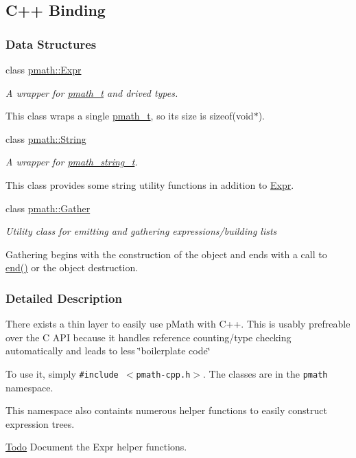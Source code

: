 \hypertarget{group__cpp__binding}{
\subsection{C++ Binding}
\label{group__cpp__binding}
}
\subsubsection*{Data Structures}
\begin{CompactItemize}
\item 
class \hyperlink{classpmath_1_1_expr}{pmath::Expr}
\begin{CompactList}\small\item\em A wrapper for \hyperlink{classpmath__t}{pmath\_\-t} and drived types.

This class wraps a single \hyperlink{classpmath__t}{pmath\_\-t}, so its size is sizeof(void$\ast$). \item\end{CompactList}\item 
class \hyperlink{classpmath_1_1_string}{pmath::String}
\begin{CompactList}\small\item\em A wrapper for \hyperlink{classpmath__string__t}{pmath\_\-string\_\-t}.

This class provides some string utility functions in addition to \hyperlink{classpmath_1_1_expr}{Expr}. \item\end{CompactList}\item 
class \hyperlink{classpmath_1_1_gather}{pmath::Gather}
\begin{CompactList}\small\item\em Utility class for emitting and gathering expressions/building lists

Gathering begins with the construction of the object and ends with a call to \hyperlink{classpmath_1_1_gather_d686bb5cc8ffc544bff3f7aaa3723061}{end()} or the object destruction. \item\end{CompactList}\end{CompactItemize}


\subsubsection{Detailed Description}
There exists a thin layer to easily use pMath with C++. This is usably prefreable over the C API because it handles reference counting/type checking automatically and leads to less \char`\"{}boilerplate code\char`\"{}

To use it, simply {\tt \#include $<$pmath-cpp.h$>$}. The classes are in the {\tt pmath} namespace.

This namespace also containts numerous helper functions to easily construct expression trees.

\begin{Desc}
\item[\hyperlink{todo__todo000001}{Todo}]Document the Expr helper functions.\end{Desc}
